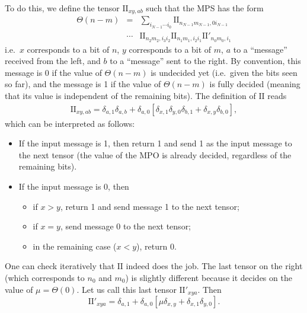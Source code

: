 \documentclass{SciPost}
\begin{document}
To do this, we define the tensor $\text{II}_{xy,ab}$ such that the MPS has the form
\begin{eqnarray}
\Theta(n-m) &=& \sum_{i_{N-1}\cdots{}i_0} \text{II}_{n_{N-1}m_{N-1},0i_{N-1}}
\nonumber \\
&\cdots{}&\text{II}_{n_{2}m_{2},i_{3}i_2}
\text{II}_{n_{1}m_{1},i_{2}i_1}  \text{II}'_{n_{0}m_{0},i_{1} }
\end{eqnarray}
i.e.\ $x$ corresponds to a bit of $n$, $y$ corresponds to a bit of $m$, $a$ to a
``message'' received from the left, and $b$ to a ``message'' sent to the right. By convention, this message is 0 if the value of $\Theta(n-m)$ is undecided yet (i.e.\ given the bits seen so far), and the message is 1 if the value of $\Theta(n-m)$ is fully decided (meaning that its value is independent of the remaining bits). The definition of $\text{II}$ reads
\begin{eqnarray}
\text{II}_{xy,ab} = \delta_{a,1} \delta_{a,b} +
\delta_{a,0} [ \delta_{x,1}\delta_{y,0} \delta_{b,1}
+ \delta_{x,y} \delta_{b,0} ],
\end{eqnarray}
which can be interpreted as follows:
\begin{itemize}
\item If the input message is 1, then return 1 and send 1 as the input message to the next tensor (the value of the MPO is already decided, regardless of the remaining bits).
\item If the input message is 0, then
  \begin{itemize}
  \item if $x>y$, return 1 and send message 1 to the next tensor;
  \item if $x=y$, send message 0 to the next tensor;
  \item in the remaining case ($x<y$), return 0.
  \end{itemize}
\end{itemize}
One can check iteratively that $\text{II}$ indeed does the job. 
The last tensor on the right (which corresponds to $n_0$ and $m_0$) is slightly
different because it decides on the value of $\mu=\Theta(0)$.
Let us call this last tensor $\text{II}'_{xya}$. Then
\begin{equation}
\text{II}'_{xya} = \delta_{a,1}  +
\delta_{a,0} [ \mu \delta_{x,y} + \delta_{x,1} \delta_{y,0} ].
\end{equation}
\end{document}

